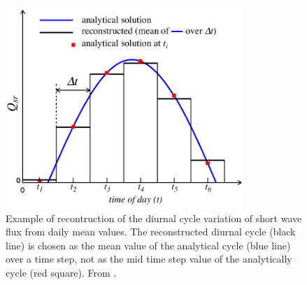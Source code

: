 \begin{figure}[!t]    \begin{center}
\includegraphics[width=0.8\textwidth]{./TexFiles/Figures/Fig_SBC_diurnal.pdf}
\caption{ \label{Fig_SBC_diurnal}    
Example of recontruction of the diurnal cycle variation of short wave flux  
from daily mean values. The reconstructed diurnal cycle (black line) is chosen 
as the mean value of the analytical cycle (blue line) over a time step, not 
as the mid time step value of the analytically cycle (red square). From \citet{Bernie_al_CD07}.}
\end{center}   \end{figure}

